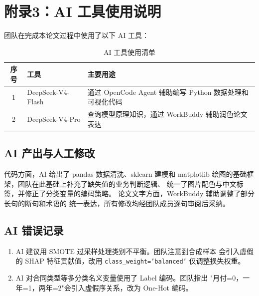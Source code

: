 \section{附录3：AI 工具使用说明}

团队在完成本论文过程中使用了以下 AI 工具：

\begin{table}[htbp]
    \centering
    \caption{AI 工具使用清单}
    \label{tab:ai_usage}
    \small
    \begin{tabular}{clp{7cm}}
        \toprule
        序号 & 工具 & 主要用途 \\
        \midrule
        1 & DeepSeek-V4-Flash &
        通过 OpenCode Agent 辅助编写 Python 数据处理和可视化代码 \\
        2 & DeepSeek-V4-Pro & 查询模型原理知识，通过 WorkBuddy 辅助润色论文表达 \\
        \bottomrule
    \end{tabular}
\end{table}

\subsection*{AI 产出与人工修改}

代码方面，AI 给出了 pandas 数据清洗、sklearn 建模和 matplotlib
绘图的基础框架，团队在此基础上补充了缺失值的业务判断逻辑、
统一了图片配色与中文标签，并修正了分类变量的编码策略。
论文文字方面，WorkBuddy 辅助调整了部分长句的断句和术语的
统一表达，所有修改均经团队成员逐句审阅后采纳。

\subsection*{AI 错误记录}

\begin{enumerate}
    \item AI 建议用 SMOTE 过采样处理类别不平衡。团队注意到合成样本
    会引入虚假的 SHAP 特征贡献值，改用 \texttt{class\_weight='balanced'}
    仅调整损失权重。
    \item AI 对合同类型等多分类名义变量使用了 Label 编码。团队指出
    "月付=0，一年=1，两年=2"会引入虚假序关系，改为 One-Hot 编码。
\end{enumerate}
